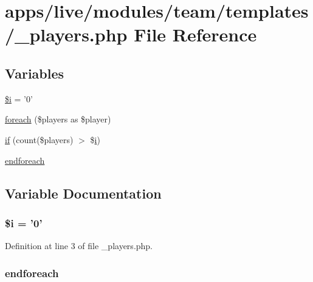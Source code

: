 \hypertarget{live_2modules_2team_2templates_2__players_8php}{\section{apps/live/modules/team/templates/\-\_\-players.php File Reference}
\label{live_2modules_2team_2templates_2__players_8php}
}
\subsection*{Variables}
\begin{DoxyCompactItemize}
\item 
\hyperlink{live_2modules_2team_2templates_2__players_8php_a83018d9153d17d91fbcf3bc10158d34f}{\$i} = '0'
\item 
\hyperlink{live_2modules_2team_2templates_2__players_8php_aedfa831323d1db745089a661af05d36d}{foreach} (\$players as \$player)
\item 
\hyperlink{live_2modules_2team_2templates_2__players_8php_ad69879f7f4de15372243fefc11871bf0}{if} (count(\$players) $>$ \$\hyperlink{live_2modules_2partner_2templates_2__rolling_8php_a7e98b8a17c0aad30ba64d47b74e2a6c1}{i})
\item 
\hyperlink{live_2modules_2team_2templates_2__players_8php_a672d9707ef91db026c210f98cc601123}{endforeach}
\end{DoxyCompactItemize}


\subsection{Variable Documentation}
\hypertarget{live_2modules_2team_2templates_2__players_8php_a83018d9153d17d91fbcf3bc10158d34f}{
\subsubsection[{\$i}]{\setlength{\rightskip}{0pt plus 5cm}\${\bf i} = '0'}}\label{live_2modules_2team_2templates_2__players_8php_a83018d9153d17d91fbcf3bc10158d34f}


Definition at line 3 of file \-\_\-players.\-php.

\hypertarget{live_2modules_2team_2templates_2__players_8php_a672d9707ef91db026c210f98cc601123}{
\subsubsection[{endforeach}]{\setlength{\rightskip}{0pt plus 5cm}endforeach}}\label{live_2modules_2team_2templates_2__players_8php_a672d9707ef91db026c210f98cc601123}



